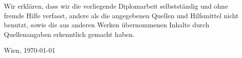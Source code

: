 Wir erklären, dass wir die vorliegende Diplomarbeit selbstständig und ohne fremde Hilfe verfasst, andere als die angegebenen Quellen und Hilfsmittel nicht benutzt, sowie die aus anderen Werken übernommenen Inhalte durch Quellenangaben erkenntlich gemacht haben.

Wien, \today

